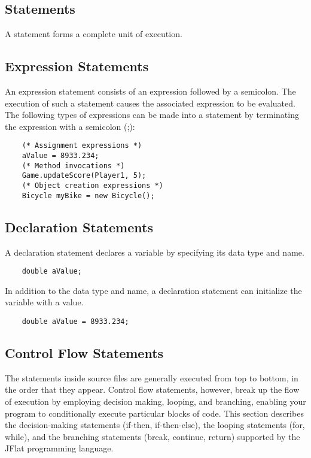 \begin{homeworkProblem}
	\chapter{Statements}
	A statement forms a complete unit of execution. 

	\section{Expression Statements}
	An expression statement consists of an expression followed by a semicolon. The execution of such a statement causes the associated expression to be evaluated. The following types of expressions can be made into a statement by terminating the expression with a semicolon (;):
	\begin{verbatim}
	(* Assignment expressions *)
	aValue = 8933.234;
	(* Method invocations *)
	Game.updateScore(Player1, 5);
	(* Object creation expressions *)
	Bicycle myBike = new Bicycle();
	\end{verbatim}
	
	\section{Declaration Statements}
	A declaration statement declares a variable by specifying its data type and name.
	\begin{verbatim}
	double aValue;
	\end{verbatim}

	In addition to the data type and name, a declaration statement can initialize the variable with a value.
	\begin{verbatim} 
	double aValue = 8933.234;
	\end{verbatim}
	
	\section{Control Flow Statements}
	The statements inside source files are generally executed from top to bottom, in the order that they appear. Control flow statements, however, break up the flow of execution by employing decision making, looping, and branching, enabling your program to conditionally execute particular blocks of code. This section describes the decision-making statements (if-then, if-then-else), the looping statements (for, while), and the branching statements (break, continue, return) supported by the JFlat programming language.


\end{homeworkProblem}
